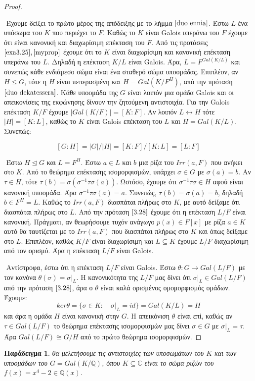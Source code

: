 \documentclass[oneside,a4paper]{article}
\newtheorem{example}{Παράδειγμα}
\newcommand {\tl}{\textlatin}
\newcommand{\Q}{\mathbb{Q}}
\begin{document}
\begin{proof}$ $
	
	$ $\newline
	Έχουμε δείξει το πρώτο μέρος της απόδειξης με το λήμμα $\ref{duo ennia}$. Έστω $L$ ένα υπόσωμα του $K$ που περιέχει το $F$. Καθώς το $K$ είναι \tl{Galois} υπεράνω του $F$ έχουμε ότι είναι κανονική και διαχωρίσιμη επέκταση του $F$. Από τις προτάσεις $\ref{exa3.25},\ref{myprop}$ έχουμε ότι το $K$ είναι διαχωρίσιμη και κανονική επέκταση υπεράνω του $L$. Δηλαδή η επέκταση $K/L$ είναι \tl{Galois}. Άρα, $L = F^{Gal(K/L)}$ και συνεπώς κάθε ενδιάμεσο σώμα είναι ένα σταθερό σώμα υποομάδας. Επιπλέον, αν $H\leq G$, τότε η $H$ είναι πεπερασμένη και $H = Gal(K/F^H)$, από την πρόταση $\ref{duo dekatessera}$. Κάθε υποομάδα της $G$ είναι λοιπόν μια ομάδα \tl{Galois} και οι απεικονίσεις της εκφώνησης δίνουν την ζητούμενη αντιστοιχία. Για την \tl{Galois} επέκταση $K/F$ έχουμε $|Gal(K/F)| = [K:F]$. Αν λοιπόν $L \leftrightarrow H$ τότε $|H| = [K:L]$, καθώς το $K$ είναι \tl{Galois} επέκταση του $L$ και $H = Gal(K/L)$. Συνεπώς:
	
	$$[G:H] = |G|/|H| = [K:F] / [K:L] = [L:F]$$

	$ $\newline
	Έστω $H\unlhd G$ και $L = F^H$. Έστω $a \in L$ και $b$ μια ρίζα του $Irr(a,F)$ που ανήκει στο $K$. Από το θεώρημα επέκτασης ισομορφισμών, υπάρχει $\sigma \in G$ με $\sigma (a) = b$. Αν $\tau \in H$, τότε $\tau (b) = \sigma(\sigma^{-1} \tau \sigma (a))$. Ωστόσο, έχουμε ότι $\sigma^{-1} \tau \sigma \in H$ αφού είναι κανονική υποομάδα. Άρα $\sigma^{-1} \tau \sigma (a) = a$. Συνεπώς, $\tau (b) = \sigma (a) = b$, δηλαδή $b \in F^H = L$. Καθώς το $Irr(a,F)$ διασπάται πλήρως στο $K$, με αυτό δείξαμε ότι διασπάται πλήρως στο $L$. Από την πρόταση $\ref{3.28}$ έχουμε ότι η επέκταση $L/F$ είναι κανονική. Πράγματι, αν θεωρήσουμε τυχόν ανάγωγο $p(x) \in F[x]$ με ρίζα $a \in K$ αυτό θα ταυτίζεται με το $Irr(a,F)$ που διασπάται πλήρως στο $K$ και όπως δείξαμε στο $L$. Επιπλέον, καθώς $K/F$ είναι διαχωρίσιμη και $L \subseteq K$ έχουμε $L/F$ διαχωρίσιμη από τον ορισμό. Άρα η επέκταση $L/F$ είναι \tl{Galois}.

	$ $\newline
	Αντίστροφα, έστω ότι η επέκταση $L/F$ είναι \tl{Galois}. Έστω $\theta : G \rightarrow Gal(L/F)$ με τον κανόνα $\theta (\sigma) = \sigma|_L$. Η κανονικότητα της $L/F$ μας δίνει ότι $\sigma|_L \in Gal(L/F)$ από την πρόταση $\ref{3.28}$, άρα ο $\theta$ είναι καλά ορισμένος ομομορφισμός ομάδων. Έχουμε:
	$$ker \theta = \{\sigma \in K: \quad \sigma|_L = id\} = Gal(K/L) = H$$
	και άρα η ομάδα $H$ είναι κανονική στην $G$. Η απεικόνιση $\theta$ είναι επί, καθώς αν $\tau \in Gal(L/F)$ το θεώρημα επέκτασης ισομορφισμών μας δίνει $\sigma \in G$ με $\sigma|_L = \tau$. Άρα $Gal(L/F) \cong G/H$ από το πρώτο θεώρημα ισομορφισμών. 
\end{proof}
\vspace{0.1cm}
\begin{example}
θα μελετήσουμε τις αντιστοιχίες των υποσωμάτων του $K$ και των υποομάδων του $G=Gal(K/ \Q )$, όπου $K \subseteq \mathbb C$ είναι το σώμα ριζών του $f(x) = x^4 - 2 \in \Q (x)$.
\end{example}
\end{document}
